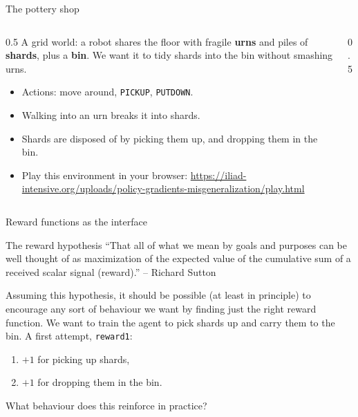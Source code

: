 \begin{frame}{The pottery shop}
\begin{columns}
\begin{column}{0.5\textwidth}
A grid world: a robot shares the floor with fragile \textbf{urns} and piles of \textbf{shards}, 
plus a \textbf{bin}. We want it to tidy shards into the bin without smashing urns.
\begin{itemize}
  \item Actions: move around, \texttt{PICKUP}, \texttt{PUTDOWN}.
  \item Walking into an urn breaks it into shards.
  \item Shards are disposed of by picking them up, and dropping them in the bin.
  \item Play this environment in your browser: \href{https://iliad-intensive.org/uploads/policy-gradients-misgeneralization/play.html}{https://iliad-intensive.org/uploads/policy-gradients-misgeneralization/play.html}
\end{itemize}
\end{column}
\begin{column}{0.5\textwidth}
\centering
{}\\[1ex]
\end{column}
\end{columns}
\end{frame}

\begin{frame}{Reward functions as the interface}

\begin{block}{The reward hypothesis}
  ``That all of what we mean by goals and purposes can be well thought of as maximization of the expected value of the cumulative sum of a received scalar signal (reward).'' -- Richard Sutton
\end{block}
Assuming this hypothesis, it should be possible (at least in principle) to encourage 
any sort of behaviour we want by finding just the right reward function.
\pause
\vfill
We want to train the agent to pick shards up and carry them to the bin.
A first attempt, \texttt{reward1}: 
\begin{enumerate}
\item $+1$ for picking up shards, 
\item $+1$ for dropping them in the bin.
\end{enumerate}
What behaviour does this reinforce in practice?
\end{frame}

